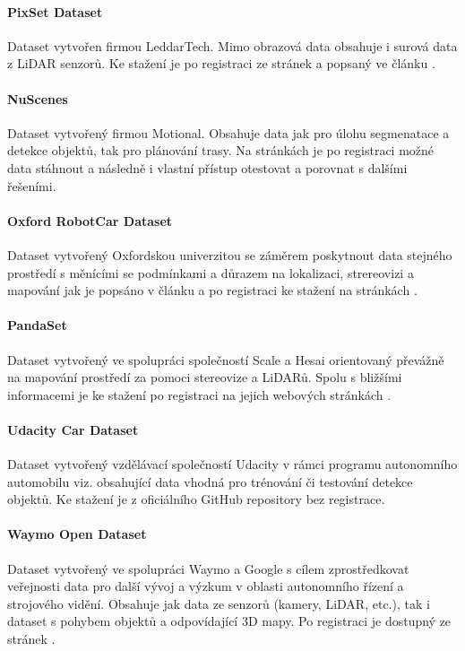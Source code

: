 \documentclass[czech, bc, kky, he, iso690numb]{fasthesis}
\begin{document}
  			\paragraph{PixSet Dataset}
  				Dataset vytvořen firmou LeddarTech. Mimo obrazová data obsahuje i surová data z LiDAR senzorů. Ke stažení je po registraci ze stránek \cite{dataset_pixset} a popsaný ve článku \cite{dataset_pixset_paper}.
  				
  			\paragraph{NuScenes}
  				Dataset vytvořený firmou Motional. Obsahuje data jak pro úlohu segmenatace a detekce objektů, tak pro plánování trasy. Na stránkách \cite{dataset_nuscenes} je po registraci možné data stáhnout a následně i vlastní přístup otestovat a porovnat s dalšími řešeními.
  				
  			\paragraph{Oxford RobotCar Dataset}
  				Dataset vytvořený Oxfordskou univerzitou se záměrem poskytnout data stejného prostředí s měnícími se podmínkami a důrazem na lokalizaci, strereovizi a mapování jak je popsáno v článku \cite{dataset_RobotCarDataset_paper} a po registraci ke stažení na stránkách \cite{dataset_RobotCarDataset}.
  				
  			\paragraph{PandaSet}
  				Dataset vytvořený ve spolupráci společností Scale a Hesai orientovaný převážně na mapování prostředí za pomoci stereovize a LiDARů. Spolu s bližšími informacemi je ke stažení po registraci na jejich webových stránkách \cite{dataset_Pandaset}.
  				
  			\paragraph{Udacity Car Dataset}
  				Dataset vytvořený vzdělávací společností Udacity v rámci programu autonomního automobilu viz. \cite{dataset_Udacity_project} obsahující data vhodná pro trénování či testování detekce objektů. Ke stažení je z oficiálního GitHub repository \cite{dataset_Udacity} bez registrace.
  				
  			\paragraph{Waymo Open Dataset}
  				Dataset vytvořený ve spolupráci Waymo a Google s cílem zprostředkovat veřejnosti data pro další vývoj a výzkum v oblasti autonomního řízení a strojového vidění. Obsahuje jak data ze senzorů (kamery, LiDAR, etc.), tak i dataset s pohybem objektů a odpovídající 3D mapy. Po registraci je dostupný ze stránek \cite{dataset_Waymo}.
  				
\end{document}
